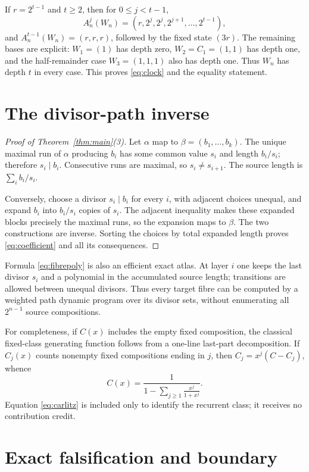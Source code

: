 \documentclass[a4paper,10pt]{amsart}
\theoremstyle{remark}
\begin{document}
If $r=2^{t-1}$ and $t\ge2$, then for $0\le j<t-1$,
\[
 A_n^j(W_n)=(r,2^j,2^j,2^{j+1},\ldots,2^{t-1}),
\]
and $A_n^{t-1}(W_n)=(r,r,r)$, followed by the fixed state $(3r)$.
The remaining bases are explicit: $W_1=(1)$ has depth zero,
$W_2=C_1=(1,1)$ has depth one, and the half-remainder case
$W_3=(1,1,1)$ also has depth one.  Thus $W_n$ has depth $t$ in every case.
This proves \eqref{eq:clock} and the equality statement.

\section{The divisor-path inverse}

\begin{proof}[Proof of Theorem~\ref{thm:main}(3)]
Let $\alpha$ map to $\beta=(b_1,\ldots,b_k)$.  The unique maximal run of
$\alpha$ producing $b_i$ has some common value $s_i$ and length $b_i/s_i$;
therefore $s_i\mid b_i$.  Consecutive runs are maximal, so
$s_i\ne s_{i+1}$.  The source length is $\sum_i b_i/s_i$.

Conversely, choose a divisor $s_i\mid b_i$ for every $i$, with adjacent
choices unequal, and expand $b_i$ into $b_i/s_i$ copies of $s_i$.  The
adjacent inequality makes these expanded blocks precisely the maximal runs,
so the expansion maps to $\beta$.  The two constructions are inverse.  Sorting
the choices by total expanded length proves \eqref{eq:coefficient} and all its
consequences.
\end{proof}

Formula \eqref{eq:fibrepoly} is also an efficient exact atlas.  At layer $i$
one keeps the last divisor $s_i$ and a polynomial in the accumulated source
length; transitions are allowed between unequal divisors.  Thus every target
fibre can be computed by a weighted path dynamic program over its divisor
sets, without enumerating all $2^{n-1}$ source compositions.

For completeness, if $C(x)$ includes the empty fixed composition, the
classical fixed-class generating function follows from a one-line last-part
decomposition.  If $C_j(x)$ counts nonempty fixed compositions ending in
$j$, then $C_j=x^j(C-C_j)$, whence
\begin{equation}\label{eq:carlitz}
 C(x)=\frac{1}{1-\displaystyle\sum_{j\ge1}\frac{x^j}{1+x^j}}.
\end{equation}
Equation \eqref{eq:carlitz} is included only to identify the recurrent class;
it receives no contribution credit.

\section{Exact falsification and boundary}
\end{document}
